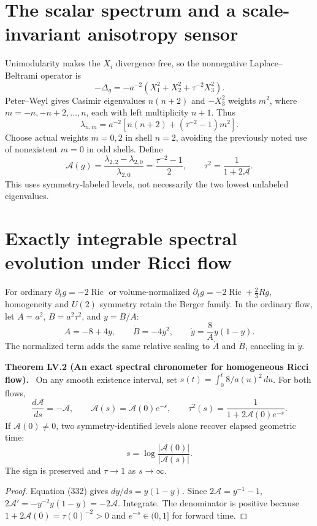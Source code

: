 \documentclass[11pt,a4paper,oneside]{book}
\newcommand{\statement}[3]{\par\medskip\noindent\textbf{#1 #2 (#3).}\ }
\begin{document}
\section{The scalar spectrum and a scale-invariant anisotropy sensor}
Unimodularity makes the $X_i$ divergence free, so the nonnegative Laplace--Beltrami operator is
\begin{equation}-\Delta_g=-a^{-2}(X_1^2+X_2^2+\tau^{-2}X_3^2).\tag{329}\end{equation}
Peter--Weyl gives Casimir eigenvalues $n(n+2)$ and $-X_3^2$ weights $m^2$, where $m=-n,-n+2,\ldots,n$, each with left multiplicity $n+1$. Thus
\begin{equation}\lambda_{n,m}=a^{-2}[n(n+2)+(\tau^{-2}-1)m^2].\tag{330}\end{equation}
Choose actual weights $m=0,2$ in shell $n=2$, avoiding the previously noted use of nonexistent $m=0$ in odd shells. Define
\begin{equation}\mathcal A(g)=\frac{\lambda_{2,2}-\lambda_{2,0}}{\lambda_{2,0}}=\frac{\tau^{-2}-1}2,\qquad\tau^2=\frac1{1+2\mathcal A}.\tag{331}\end{equation}
This uses symmetry-labeled levels, not necessarily the two lowest unlabeled eigenvalues.
\section{Exactly integrable spectral evolution under Ricci flow}
For ordinary $\partial_tg=-2\operatorname{Ric}$ or volume-normalized $\partial_tg=-2\operatorname{Ric}+\tfrac23Rg$, homogeneity and $U(2)$ symmetry retain the Berger family. In the ordinary flow, let $A=a^2$, $B=a^2\tau^2$, and $y=B/A$:
\begin{equation}\dot A=-8+4y,\qquad\dot B=-4y^2,\qquad\dot y=\frac8A y(1-y).\tag{332}\end{equation}
The normalized term adds the same relative scaling to $\dot A$ and $\dot B$, canceling in $\dot y$.
\statement{Theorem}{LV.2}{An exact spectral chronometer for homogeneous Ricci flow}
On any smooth existence interval, set $s(t)=\int_0^t8/a(u)^2\,du$. For both flows,
\begin{equation}\frac{d\mathcal A}{ds}=-\mathcal A,\qquad\mathcal A(s)=\mathcal A(0)e^{-s},\qquad\tau^2(s)=\frac1{1+2\mathcal A(0)e^{-s}}.\tag{333}\end{equation}
If $\mathcal A(0)\ne0$, two symmetry-identified levels alone recover elapsed geometric time:
\begin{equation}s=\log\frac{|\mathcal A(0)|}{|\mathcal A(s)|}.\tag{334}\end{equation}
The sign is preserved and $\tau\to1$ as $s\to\infty$.
\begin{proof}
Equation (332) gives $dy/ds=y(1-y)$. Since $2\mathcal A=y^{-1}-1$, $2\mathcal A'=-y^{-2}y(1-y)=-2\mathcal A$. Integrate. The denominator is positive because $1+2\mathcal A(0)=\tau(0)^{-2}>0$ and $e^{-s}\in(0,1]$ for forward time.
\end{proof}
\end{document}
